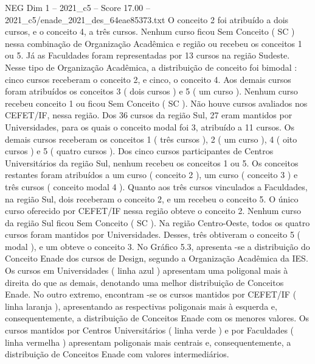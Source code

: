 \begin{textsample}{NEG Dim 1 – 2021\_c5 – Score 17.00 – 2021\_c5/enade\_2021\_des\_64eae85373.txt}
O conceito 2 foi atribuído a dois cursos, e o conceito 4, a três cursos.
Nenhum curso ficou Sem Conceito ( SC ) nessa combinação de Organização Acadêmica e região ou recebeu os conceitos 1 ou 5.
Já as Faculdades foram representadas por 13 cursos na região Sudeste.
Nesse tipo de Organização Acadêmica, a distribuição de conceito foi bimodal : cinco cursos receberam o conceito 2, e cinco, o conceito 4.
Aos demais cursos foram atribuídos os conceitos 3 ( dois cursos ) e 5 ( um curso ).
Nenhum curso recebeu conceito 1 ou ficou Sem Conceito ( SC ).
Não houve cursos avaliados nos CEFET/IF, nessa região.
Dos 36 cursos da região Sul, 27 eram mantidos por Universidades, para os quais o conceito modal foi 3, atribuído a 11 cursos.
Os demais cursos receberam os conceitos 1 ( três cursos ), 2 ( um curso ), 4 ( oito cursos ) e 5 ( quatro cursos ).
Dos cinco cursos participantes de Centros Universitários da região Sul, nenhum recebeu os conceitos 1 ou 5.
Os conceitos restantes foram atribuídos a um curso ( conceito 2 ), um curso ( conceito 3 ) e três cursos ( conceito modal 4 ).
Quanto aos três cursos vinculados a Faculdades, na região Sul, dois receberam o conceito 2, e um recebeu o conceito 5.
O único curso oferecido por CEFET/IF nessa região obteve o conceito 2.
Nenhum curso da região Sul ficou Sem Conceito ( SC ).
Na região Centro-Oeste, todos os quatro cursos foram mantidos por Universidades.
Desses, três obtiveram o conceito 5 ( modal ), e um obteve o conceito 3.
No Gráfico 5.3, apresenta -se a distribuição do Conceito Enade dos cursos de Design, segundo a Organização Acadêmica da IES.
Os cursos em Universidades ( linha azul ) apresentam uma poligonal mais à direita do que as demais, denotando uma melhor distribuição de Conceitos Enade.
No outro extremo, encontram -se os cursos mantidos por CEFET/IF ( linha laranja ), apresentando as respectivas poligonais mais à esquerda e, consequentemente, a distribuição de Conceitos Enade com os menores valores.
Os cursos mantidos por Centros Universitários ( linha verde ) e por Faculdades ( linha vermelha ) apresentam poligonais mais centrais e, consequentemente, a distribuição de Conceitos Enade com valores intermediários.

\end{textsample}
